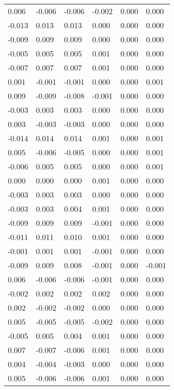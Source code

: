 \begin{longtable}{llllll}
0.006  & -0.006 & -0.006 & -0.002   & 0.000   & 0.000  \\
-0.013 & 0.013  & 0.013  & 0.000    & 0.000   & 0.000  \\
-0.009 & 0.009  & 0.009  & 0.000    & 0.000   & 0.000  \\
-0.005 & 0.005  & 0.005  & 0.001    & 0.000   & 0.000  \\
-0.007 & 0.007  & 0.007  & 0.001    & 0.000   & 0.000  \\
0.001  & -0.001 & -0.001 & 0.000    & 0.000   & 0.001  \\
0.009  & -0.009 & -0.008 & -0.001   & 0.000   & 0.000  \\
-0.003 & 0.003  & 0.003  & 0.000    & 0.000   & 0.000  \\
0.003  & -0.003 & -0.003 & 0.000    & 0.000   & 0.000  \\
-0.014 & 0.014  & 0.014  & 0.001    & 0.000   & 0.001  \\
0.005  & -0.006 & -0.005 & 0.000    & 0.000   & 0.001  \\
-0.006 & 0.005  & 0.005  & 0.000    & 0.000   & 0.001  \\
0.000  & 0.000  & 0.000  & 0.001    & 0.000   & 0.000  \\
-0.003 & 0.003  & 0.003  & 0.000    & 0.000   & 0.000  \\
-0.003 & 0.003  & 0.004  & 0.001    & 0.000   & 0.000  \\
-0.009 & 0.009  & 0.009  & -0.001   & 0.000   & 0.000  \\
-0.011 & 0.011  & 0.010  & 0.001    & 0.000   & 0.000  \\
-0.001 & 0.001  & 0.001  & -0.001   & 0.000   & 0.000  \\
-0.009 & 0.009  & 0.008  & -0.001   & 0.000   & -0.001 \\
0.006  & -0.006 & -0.006 & -0.001   & 0.000   & 0.000  \\
-0.002 & 0.002  & 0.002  & 0.002    & 0.000   & 0.000  \\
0.002  & -0.002 & -0.002 & 0.000    & 0.000   & 0.000  \\
0.005  & -0.005 & -0.005 & -0.002   & 0.000   & 0.000  \\
-0.005 & 0.005  & 0.004  & 0.001    & 0.000   & 0.000  \\
0.007  & -0.007 & -0.006 & 0.001    & 0.000   & 0.000  \\
0.004  & -0.004 & -0.003 & 0.000    & 0.000   & 0.000  \\
0.005  & -0.006 & -0.006 & 0.001    & 0.000   & 0.000  \\

\end{longtable}
